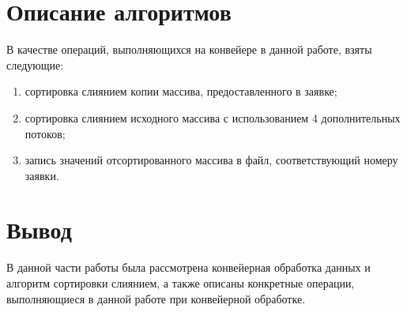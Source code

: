 \section{Описание алгоритмов}
В качестве операций, выполняющихся на конвейере в данной работе, взяты следующие:
\begin{enumerate}
	\item сортировка слиянием копии массива, предоставленного в заявке;
	\item сортировка слиянием исходного массива с использованием 4 дополнительных потоков;
	\item запись значений отсортированного массива в файл, соответствующий номеру заявки.
\end{enumerate}


\section*{Вывод}
В данной части работы была рассмотрена конвейерная обработка данных и алгоритм сортировки слиянием, а также описаны конкретные операции, выполняющиеся в данной работе при конвейерной обработке.
